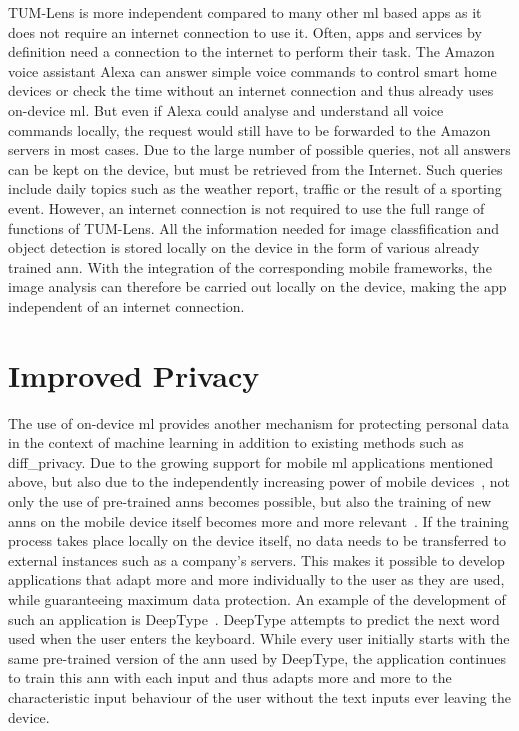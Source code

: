 \documentclass[
			   fontsize=11pt,
               paper=a4,
               bibliography=totoc,
               idxtotoc,
               headsepline,
               footsepline,
               footinclude=false,
               BCOR=12mm,
               DIV=13,
               openany,   %
               ]
               {scrbook}
\begin{document}
TUM-Lens is more independent compared to many other \acrlong{ml} based apps as it does not require an internet connection to use it. Often, apps and services by definition need a connection to the internet to perform their task. The Amazon voice assistant Alexa can answer simple voice commands to control smart home devices or check the time without an internet connection and thus already uses on-device \acrlong{ml}. But even if Alexa could analyse and understand all voice commands locally, the request would still have to be forwarded to the Amazon servers in most cases. Due to the large number of possible queries, not all answers can be kept on the device, but must be retrieved from the Internet. Such queries include daily topics such as the weather report, traffic or the result of a sporting event. However, an internet connection is not required to use the full range of functions of TUM-Lens. All the information needed for image classfification and object detection is stored locally on the device in the form of various already trained \gls{ann}. With the integration of the corresponding mobile frameworks, the image analysis can therefore be carried out locally on the device, making the app independent of an internet connection.

\section{Improved Privacy}

The use of on-device \gls{ml} provides another mechanism for protecting personal data in the context of machine learning in addition to existing methods such as \gls{diff_privacy}. Due to the growing support for mobile \gls{ml} applications mentioned above, but also due to the independently increasing power of mobile devices~\cite{mobile_cpu_power}, not only the use of pre-trained \glspl{ann} becomes possible, but also the training of new \glspl{ann} on the mobile device itself becomes more and more relevant~\cite{liu19}. If the training process takes place locally on the device itself, no data needs to be transferred to external instances such as a company's servers. This makes it possible to develop applications that adapt more and more individually to the user as they are used, while guaranteeing maximum data protection. An example of the development of such an application is DeepType~\cite{deepType}. DeepType attempts to predict the next word used when the user enters the keyboard. While every user initially starts with the same pre-trained version of the \gls{ann} used by DeepType, the application continues to train this \gls{ann} with each input and thus adapts more and more to the characteristic input behaviour of the user without the text inputs ever leaving the device.
\end{document}
